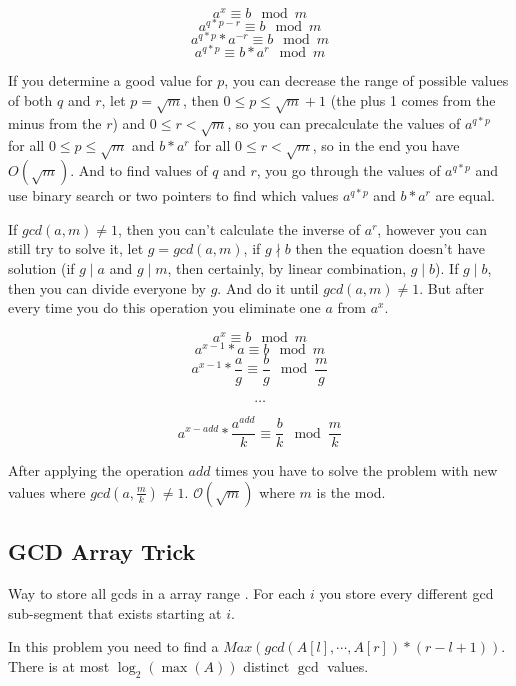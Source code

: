     $$
    a^x \equiv b \mod{m} 
    $$
    $$
    a^{q*p-r} \equiv b \mod{m}
    $$
    $$
    a^{q*p}*a^{-r} \equiv b \mod{m}
    $$
    $$
    a^{q*p} \equiv b*a^r \mod{m}
    $$

    If you determine a good value for $p$, you can decrease the range of possible values of both $q$ and $r$, let $p = \sqrt{m}$, then $0 \leq p \leq \sqrt{m}+1$ (the plus 1 comes from the minus from the $r$) and $0 \leq r < \sqrt{m}$, so you can precalculate the values of $a^{q*p}$ for all $0 \leq p \leq \sqrt{m}$ and $b*a^{r}$ for all $0 \leq r < \sqrt{m}$, so in the end you have $O(\sqrt{m})$. And to find values of $q$ and $r$, you go through the values of $a^{q*p}$ and use binary search or two pointers to find which values $a^{q*p}$ and $b*a^r$ are equal.

    If $gcd(a,m) \neq 1$, then you can't calculate the inverse of $a^r$, however you can still try to solve it, let $g = gcd(a,m)$, if $g \nmid b$ then the equation doesn't have solution (if $g \mid a$ and $g \mid m$, then certainly, by linear combination, $g \mid b$). If $g \mid b$, then you can divide everyone by $g$. And do it until $gcd(a,m) \neq 1$. But after every time you do this operation you eliminate one $a$ from $a^x$.

    $$a^x \equiv b \mod{m}$$
    $$a^{x-1}*a \equiv b \mod{m}$$
    $$a^{x-1}*\frac{a}{g} \equiv \frac{b}{g} \mod{\frac{m}{g}}$$
    
    $$\dots$$
    
    $$a^{x-add}*\frac{a^{add}}{k} \equiv \frac{b}{k} \mod{\frac{m}{k}}$$

    After applying the operation $add$ times you have to solve the problem with new values where $gcd(a,\frac{m}{k}) \neq 1$. $\mathcal{O}(\sqrt{m})$ where $m$ is the mod.


    \subsection{GCD Array Trick}
    Way to store all gcds in a array range . For each $i$ you store every different gcd sub-segment that exists starting at $i$.
    
    In this problem you need to find a $Max(gcd(A[l],\cdots,A[r])*(r-l+1))$. There is at most $\log_2(\max(A))$ distinct $\gcd$ values. 
    
        

